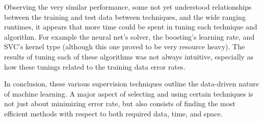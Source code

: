 \documentclass{article}
\begin{document}
Observing the very similar performance, some not yet understood relationships between the training and test data between techniques, and the wide ranging runtimes, it appears that more time could be spent in tuning each technique and algorithm. For example the neural net's solver, the boosting's learning rate, and SVC's kernel type (although this one proved to be very resource heavy). The results of tuning each of these algorithms was not always intuitive, especially as how these tunings related to the training data error rates.

In conclusion, these various supervision techniques outline the data-driven nature of machine learning. A major aspect of selecting and using certain techniques is not just about minimizing error rate, but also consists of finding the most efficient methods with respect to both required data, time, and space.

\pagebreak

\appendix
\end{document}
